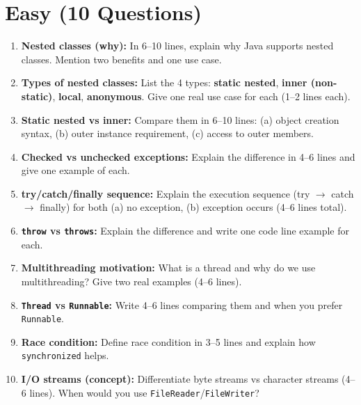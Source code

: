 \documentclass[11pt,a4paper]{article}
\begin{document}
\section*{Easy (10 Questions)}
\begin{enumerate}[label=E\arabic*., leftmargin=*]
  \item \textbf{Nested classes (why):} In 6--10 lines, explain why Java supports nested classes.
    Mention two benefits and one use case.

  \item \textbf{Types of nested classes:} List the 4 types:
    \textbf{static nested}, \textbf{inner (non-static)}, \textbf{local}, \textbf{anonymous}.
    Give one real use case for each (1--2 lines each).

  \item \textbf{Static nested vs inner:} Compare them in 6--10 lines:
    (a) object creation syntax, (b) outer instance requirement, (c) access to outer members.

  \item \textbf{Checked vs unchecked exceptions:} Explain the difference in 4--6 lines and give one example of each.

  \item \textbf{try/catch/finally sequence:} Explain the execution sequence (try $\rightarrow$ catch $\rightarrow$ finally)
    for both (a) no exception, (b) exception occurs (4--6 lines total).

  \item \textbf{\texttt{throw} vs \texttt{throws}:} Explain the difference and write one code line example for each.

  \item \textbf{Multithreading motivation:} What is a thread and why do we use multithreading?
    Give two real examples (4--6 lines).

  \item \textbf{\texttt{Thread} vs \texttt{Runnable}:} Write 4--6 lines comparing them and when you prefer \texttt{Runnable}.

  \item \textbf{Race condition:} Define race condition in 3--5 lines and explain how \texttt{synchronized} helps.

  \item \textbf{I/O streams (concept):} Differentiate byte streams vs character streams (4--6 lines).
    When would you use \texttt{FileReader}/\texttt{FileWriter}?
\end{enumerate}
\end{document}
